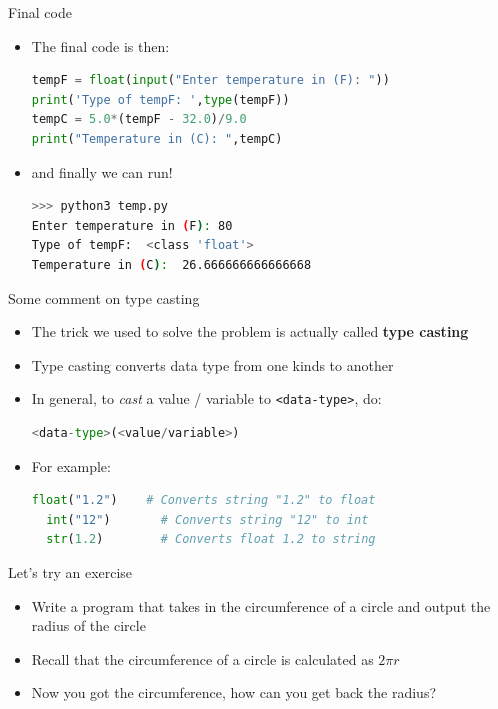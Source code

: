 \documentclass[10pt,xcolor={table,dvipsnames},t]{beamer}
\begin{document}
\begin{frame}[fragile]{Final code}
  \begin{itemize}
    \item The final code is then:
\begin{lstlisting}[language=python]
tempF = float(input("Enter temperature in (F): ")) 
print('Type of tempF: ',type(tempF))
tempC = 5.0*(tempF - 32.0)/9.0
print("Temperature in (C): ",tempC)
\end{lstlisting}
  \item and finally we can run!
\begin{lstlisting}[language=bash]
>>> python3 temp.py
Enter temperature in (F): 80
Type of tempF:  <class 'float'>
Temperature in (C):  26.666666666666668
\end{lstlisting}
  \end{itemize}
\end{frame}

\begin{frame}[fragile]{Some comment on type casting}
  \begin{itemize}
    \item The trick we used to solve the problem is actually called \textbf{type casting}
    \item Type casting converts data type from one kinds to another
    \item In general, to \textit{cast} a value / variable to \texttt{<data-type>}, do:
\begin{lstlisting}[language=python]
  <data-type>(<value/variable>)
\end{lstlisting}
    \item For example:
\begin{lstlisting}[language=python]
  float("1.2")    # Converts string "1.2" to float 
  int("12")       # Converts string "12" to int 
  str(1.2)        # Converts float 1.2 to string 
\end{lstlisting}
  \end{itemize}
\end{frame}


\begin{frame}[fragile]{Let's try an exercise}
  \begin{itemize}
    \item Write a program that takes in the circumference of a circle and output the radius of the circle
    \item Recall that the circumference of a circle is calculated as $2\pi r$
    \item Now you got the circumference, how can you get back the radius?
  \end{itemize}
\end{frame}
\end{document}
